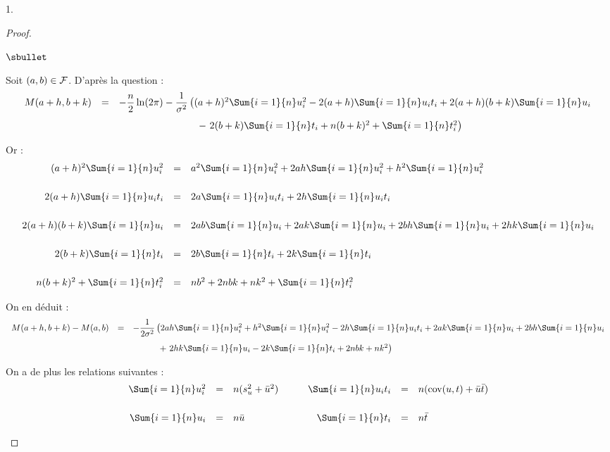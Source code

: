 \documentclass[11pt]{article}%
\begin{document}
\begin{noliste}{1.}
 \begin{proof}~
 \begin{noliste}{$\sbullet$}
  \item Soit $(a,b) \in {\cal F}$. D'après la question  :
  \[
   \begin{array}{rcl}
     M(a+h, b+k)
     & = & -\dfrac{n}{2} \ln(2\pi) - \dfrac{1}{\sigma^2}
    \left((a+h)^2 \Sum{i=1}{n} u_i^2 -2(a+h) \Sum{i=1}{n} u_i t_i
    +2(a+h)(b+k) \Sum{i=1}{n} u_i \right.
    \\[.4cm]
    & & \left. \qquad \qquad \qquad \qquad - \ 2(b+k) \Sum{i=1}{n} t_i
    +n(b+k)^2 + \Sum{i=1}{n} t_i^2 \right)
   \end{array}
  \]  
  
  Or :
  \[
   \begin{array}{rcl}
    (a+h)^2 \Sum{i=1}{n} u_i^2 &=& a^2 \Sum{i=1}{n} u_i^2 + 2ah 
    \Sum{i=1}{n} u_i^2 + h^2 \Sum{i=1}{n} u_i^2
    \\[.6cm]
    2(a+h) \Sum{i=1}{n} u_i t_i &=& 2a \Sum{i=1}{n} u_it_i
    + 2h \Sum{i=1}{n} u_i t_i
    \\[.6cm]
    2(a+h)(b+k) \Sum{i=1}{n} u_i &=& 2ab \Sum{i=1}{n} u_i + 2ak
    \Sum{i=1}{n} u_i + 2bh \Sum{i=1}{n} u_i + 2hk \Sum{i=1}{n} u_i
    \\[.6cm]
    2(b+k) \Sum{i=1}{n} t_i &=& 2b \Sum{i=1}{n} t_i + 2k \Sum{i=1}{n} 
    t_i
    \\[.6cm]
    n(b+k)^2 + \Sum{i=1}{n} t_i^2 &=& n b^2
    + 2nbk + nk^2 + \Sum{i=1}{n} t_i^2
   \end{array}
  \]
  
  On en déduit :
  \[
  \begin{array}{rcl}
   M(a+h,b+k) - M(a,b) &=& -\dfrac{1}{2\sigma^2} \left(
   2ah \Sum{i=1}{n} u_i^2 + h^2 \Sum{i=1}{n} u_i^2 -2h \Sum{i=1}{n}
   u_i t_i + 2ak \Sum{i=1}{n} u_i + 2bh \Sum{i=1}{n} u_i \right.
   \\[.4cm]
   & & \qquad \quad \left. + \ 2 hk \Sum{i=1}{n} u_i - 2k 
   \Sum{i=1}{n} t_i + 2nbk 
   +nk^2\right)
  \end{array}
  \]
  
  On a de plus les relations suivantes :
  \[
   \begin{array}{rclrcl}
    \Sum{i=1}{n} u_i^2 &=& n (s_u^2 + \bar{u}^2)
    & \qquad
    \Sum{i=1}{n} u_i t_i &=& n (\text{cov}(u,t) + \bar{u} \bar{t})
    \\[.6cm]
    \Sum{i=1}{n} u_i &=& n \bar{u}
    & \qquad
    \Sum{i=1}{n} t_i &=& n \bar{t}
   \end{array}
  \]
  

\end{noliste}
\end{proof}
\end{noliste}
\end{document}
